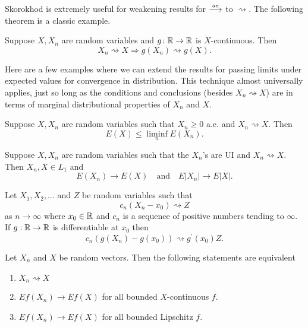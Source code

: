 Skorokhod is extremely useful for weakening results for $\overset{\small ae} \longrightarrow$ to $\rightsquigarrow$.
The following theorem is a classic example.

\begin{theorem}
Suppose $X, X_n$ are random variables and  $g\colon\Bbb R\rightarrow\Bbb R$ is $X$-continuous. Then
\[X_n \rightsquigarrow X \Longrightarrow g(X_n) \rightsquigarrow g(X).  \]
\end{theorem}

Here are a few examples where we can extend the results for passing limits under expected values for convergence in distribution. This technique almost universally applies, just so long as the conditions and conclusions (besides $X_n\rightsquigarrow X$) are in terms of marginal distributional properties of $X_n$ and $X$.

\begin{theorem}[{\bf Fatou}]
Suppose $X, X_n$ are random variables such that  $X_n\geq 0$ a.e. and $X_n\rightsquigarrow X$. Then
\[
E(X)\leq \liminf_n E(X_n).
\]
\end{theorem}



\begin{theorem}[{\bf UI}]
Suppose $X, X_n$ are random variables  such that the $X_n$'s  are UI and $X_n\rightsquigarrow X$. Then $X_n, X\in L_1$ and
\[
E(X_n)\rightarrow E(X)\quad\text{and}\quad E|X_n|\rightarrow E|X|.
\]
\end{theorem}



\begin{theorem}
Let $X_1, X_2, \ldots$ and $Z$ be random variables such that
\[c_n(X_n - x_0) \rightsquigarrow Z  \]
as $n\rightarrow \infty$ where $x_0\in \Bbb R$ and $c_n$ is a sequence of positive numbers tending to $\infty$. If $g:\Bbb R \rightarrow \Bbb R $ is differentiable at $x_0$ then
\[ c_n(g(X_n) - g(x_0)) \rightsquigarrow g^\prime(x_0)Z.  \]
\end{theorem}









\begin{theorem}
Let $X_n$ and $X$ be random vectors.
Then the following statements are equivalent
\begin{enumerate}
\item  $X_n\rightsquigarrow X $
\item  $ E f(X_n) \rightarrow E f(X)$ for all  bounded $X$-continuous $f$.
\item  $ E f(X_n) \rightarrow E f(X)$ for all  bounded Lipschitz $f$.
\end{enumerate}
\end{theorem}


